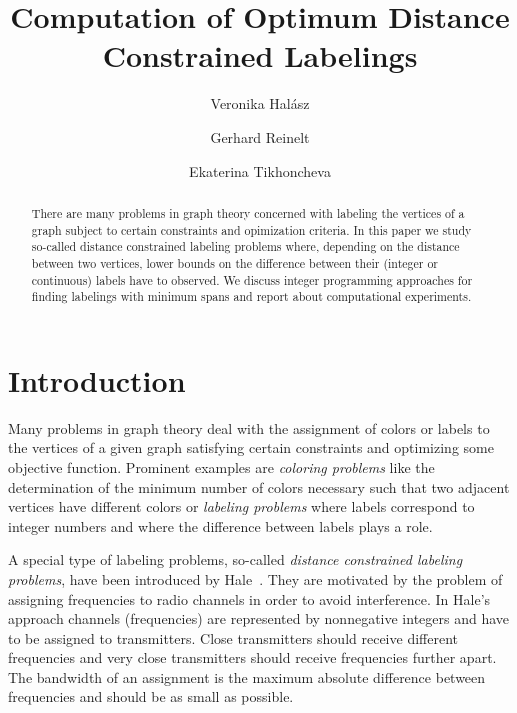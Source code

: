 \documentclass[smallextended]{svjour3}
\begin{document}
 
\title{Computation of Optimum Distance Constrained Labelings} 
\author{Veronika Hal\'asz \and Gerhard Reinelt \and Ekaterina Tikhoncheva} 

\date{\datum} 

\maketitle 

\begin{abstract} 
There are many problems in graph theory concerned with labeling the 
vertices of a graph subject to certain constraints and opimization criteria. In this 
paper we study so-called distance constrained labeling problems where, depending on 
the distance between two vertices, lower bounds on the difference 
between their (integer or continuous) labels have to observed. We discuss integer programming 
approaches for finding labelings with minimum spans and report about computational 
experiments. 
\end{abstract} 


% 
% 
% 
\section{Introduction} 
 
Many problems in graph theory deal with the assignment of colors or labels to the vertices 
of a given graph satisfying certain constraints and optimizing some objective function. 
Prominent examples are \emph{coloring problems} like the determination of the minimum 
number of colors necessary such that two adjacent vertices have different colors 
or \emph{labeling problems} where labels correspond to integer numbers and where 
the difference between labels plays a role. 

A special type of labeling problems, so-called 
\emph{distance constrained labeling problems}, have been introduced by Hale~\cite{Hal80}. 
They are motivated by the problem of assigning frequencies to radio channels in order 
to avoid interference. In Hale's approach channels (frequencies) are 
represented by nonnegative integers and have to be assigned to transmitters. 
Close transmitters should receive different frequencies and very close 
transmitters should receive frequencies further apart. The bandwidth of an assignment 
is the maximum absolute difference between frequencies and should be as small 
as possible. 
\end{document}
